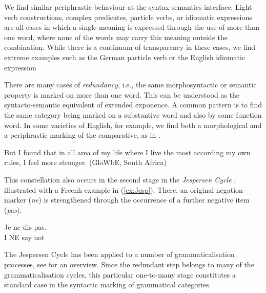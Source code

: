\documentclass[output=paper]{langscibook}
\begin{document}
We find similar periphrastic behaviour at the syntax-semantics
interface.  Light verb constructions, complex predicates, particle
verbs, or idiomatic expressions are all cases in which a single
meaning is expressed through the use of more than one word, where
none of the words may carry this meaning outside the
combination.  While there is a continuum of transparency in these
cases, we find extreme examples such as the German particle verb
 or the English idiomatic expression



\medskip%
There are many cases of \emph{redundancy}, i.e., the same
morphosyntactic or semantic property is marked on more than one
word. This can be understood as the syntacto-semantic equivalent of
extended exponence. A common pattern is to find the same category
being marked on a substantive word and also by some function word.  In
some varieties of English, for example, we find both a morphological
and a periphrastic marking of the comparative, as in
.

\ea
But I found that in all area of my life where I live the most according my own rules, I feel more stronger. (GloWbE, South Africa)\label{more-comp-sa}
\z 

This constellation also occurs in the second stage in the
\emph{Jespersen Cycle} \citep{Jespersen:17}, illustrated with a Frecnh
example in (\ref{ex:Jesp}).  There, an original
negation marker (\textit{ne}) is strengthened through the occurrence of a further
negative item (\textit{pas}).

\ea \label{ex:Jesp}
\gll Je ne dis pas.\\
I NE say not\\
 \citep[7]{Jespersen:17}

\z 

The Jespersen Cycle has been applied to a number of grammaticalisation
processes, see \citet{Gelderen:11,Gelderen:13} for an overview.  Since
the redundant step belongs to many of the grammaticalisation cycles,
this particular one-to-many stage constitutes a standard case in the
syntactic marking of grammatical categories.

\end{document}
